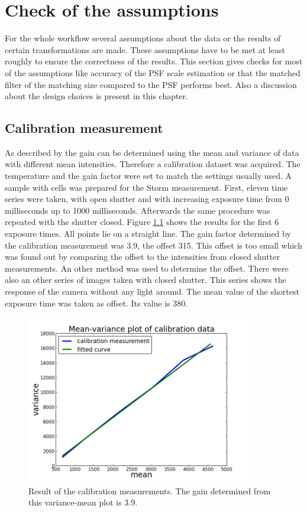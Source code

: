 \chapter{Check of the assumptions}
For the whole workflow several assumptions about the data or the results of certain transformations are made. These assumptions have to be met at least roughly to ensure the correctness of the results.\newline
This section gives checks for most of the assumptions like accuracy of the PSF scale estimation or that the matched filter of the matching size compared to the PSF performs best.\newline
Also a discussion about the design choices is present in this chapter.
\section{Calibration measurement}
As described by \cite{meanVar} the gain can be determined using the mean and variance of data with different mean intensities. Therefore a calibration dataset was acquired. The temperature and the gain factor were set to match the settings usually used. A sample with cells was prepared for the Storm measurement. First, eleven time series were taken, with open shutter and with increasing exposure time from 0 milliseconds up to 1000 milliseconds. Afterwards the same procedure was repeated with the shutter closed. Figure \ref{calibplot} shows the results for the first 6 exposure times. All points lie on a straight line. The gain factor determined by the calibration measurement was 3.9, the offset 315. This offset is too small which was found out by comparing the offset to the intensities from closed shutter measurements. An other method was used to determine the offset. There were also an other series of images taken with closed shutter. This series shows the response of the camera without any light around. The mean value of the shortest exposure time was taken as offset. Its value is 380. 
\begin{figure}
\centering
\includegraphics[width = 0.88\textwidth]{pictures/meanVariancePlotCalibration.png}
	 \caption{Result of the calibration measurements. The gain determined from this variance-mean plot is 3.9.}
	\label{calibplot}
\end{figure}


